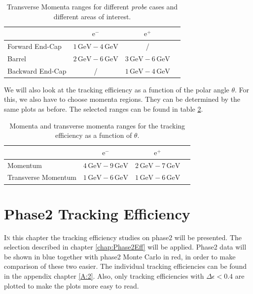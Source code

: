\documentclass[a4paper,11pt,twosided,final,german,openbib,pdftex,listof=totoc,bibliography=totoc]{scrbook}
\begin{document}
\begin{table}[h!]
	\centering
	\begin{tabular}{lccc}
		&$\textrm{e}^-$ &$\textrm{e}^+$\\
		\hline
		Forward End-Cap &$1\,\textrm{GeV} - 4\,\textrm{GeV}$&/\\
		Barrel &$2\,\textrm{GeV} - 6\,\textrm{GeV}$&$3\,\textrm{GeV} - 6\,\textrm{GeV}$\\
		Backward End-Cap & /&$1\,\textrm{GeV} - 4\,\textrm{GeV}$\\
	\end{tabular}
	
	\caption[Areas Of Interest Different Transverse Momenta Ranges]{Transverse Momenta ranges for different \textit{probe} cases and different areas of interest.}
	\label{tab:RTPtMDTable}
\end{table}

We will also look at the tracking efficiency as a function of the polar angle $\theta$. For this, we also have to choose momenta regions. They can be determined by the same plots as before.
The selected ranges can be found in table \ref{tab:RTPMDThetaTable}.

\begin{table}[h!]
	\centering
	\begin{tabular}{lccc}
		&$\textrm{e}^-$ &$\textrm{e}^+$\\
		\hline
		Momentum &$4\,\textrm{GeV} - 9\,\textrm{GeV}$&$2\,\textrm{GeV} - 7\,\textrm{GeV}$\\
		Transverse Momentum &$1\,\textrm{GeV} - 6\,\textrm{GeV}$&$1\,\textrm{GeV} - 6\,\textrm{GeV}$\\

	\end{tabular}
	
	\caption[Different (Transverse-) Momenta Ranges For $\theta$ Efficiency]{Momenta and transverse momenta ranges for the tracking efficiency as a function of $\theta$.}
	\label{tab:RTPMDThetaTable}
\end{table}

\chapter{Phase2 Tracking Efficiency}
\label{chp:TrackingEfficiencyPhase2}



\lettrine{I}{n} this chapter the tracking efficiency studies on phase2 will be presented. The selection described in chapter \ref{chap:Phase2Eff} will be applied. Phase2 data will be shown in blue together with phase2 Monte Carlo in red, in order to make comparison of these two easier. The individual tracking efficiencies can be found in the appendix chapter \ref{A:2}. Also, only tracking efficiencies with $\Delta \epsilon < 0.4$ are plotted to make the plots more easy to read. 
\newline
 
\end{document}
